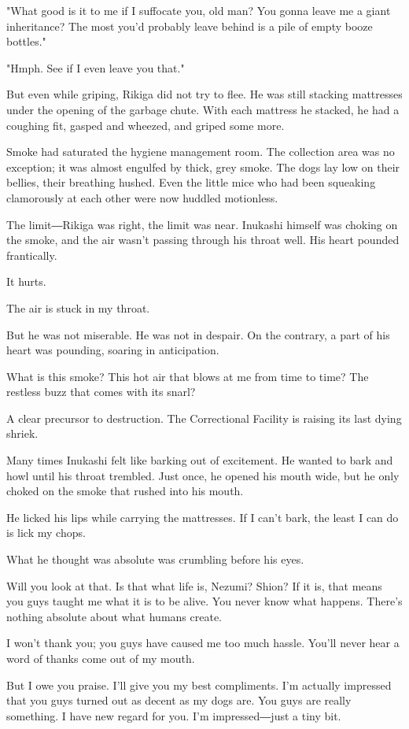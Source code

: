 "What good is it to me if I suffocate you, old man? You gonna leave me a
giant inheritance? The most you'd probably leave behind is a pile of
empty booze bottles."

"Hmph. See if I even leave you that."

But even while griping, Rikiga did not try to flee. He was still
stacking mattresses under the opening of the garbage chute. With each
mattress he stacked, he had a coughing fit, gasped and wheezed, and
griped some more.

Smoke had saturated the hygiene management room. The collection area was
no exception; it was almost engulfed by thick, grey smoke. The dogs lay
low on their bellies, their breathing hushed. Even the little mice who
had been squeaking clamorously at each other were now huddled
motionless.

The limit―Rikiga was right, the limit was near. Inukashi himself was
choking on the smoke, and the air wasn't passing through his throat
well. His heart pounded frantically.

It hurts.

The air is stuck in my throat.

But he was not miserable. He was not in despair. On the contrary, a part
of his heart was pounding, soaring in anticipation.

What is this smoke? This hot air that blows at me from time to time? The
restless buzz that comes with its snarl?

A clear precursor to destruction. The Correctional Facility is raising
its last dying shriek.

Many times Inukashi felt like barking out of excitement. He wanted to
bark and howl until his throat trembled. Just once, he opened his mouth
wide, but he only choked on the smoke that rushed into his mouth.

He licked his lips while carrying the mattresses. If I can't bark, the
least I can do is lick my chops.

What he thought was absolute was crumbling before his eyes.

Will you look at that. Is that what life is, Nezumi? Shion? If it is,
that means you guys taught me what it is to be alive. You never know
what happens. There's nothing absolute about what humans create.

I won't thank you; you guys have caused me too much hassle. You'll never
hear a word of thanks come out of my mouth.

But I owe you praise. I'll give you my best compliments. I'm actually
impressed that you guys turned out as decent as my dogs are. You guys
are really something. I have new regard for you. I'm impressed―just a
tiny bit.

